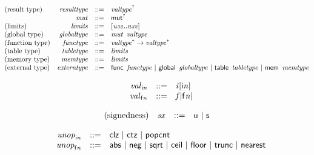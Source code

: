 $$
\begin{array}{@{}lrrl@{}l@{}}
\mbox{(result type)} & {\mathit{resulttype}} &::=& {{\mathit{valtype}}^?} \\
& {\mathit{mut}} &::=& {\mathsf{mut}^?} \\
\mbox{(limits)} & {\mathit{limits}} &::=& {}[{\mathit{u{\scriptstyle32}}} .. {\mathit{u{\scriptstyle32}}}] \\
\mbox{(global type)} & {\mathit{globaltype}} &::=& {\mathit{mut}}~\,{\mathit{valtype}} \\
\mbox{(function type)} & {\mathit{functype}} &::=& {{\mathit{valtype}}^\ast} \rightarrow {{\mathit{valtype}}^\ast} \\
\mbox{(table type)} & {\mathit{tabletype}} &::=& {\mathit{limits}} \\
\mbox{(memory type)} & {\mathit{memtype}} &::=& {\mathit{limits}} \\
\mbox{(external type)} & {\mathit{externtype}} &::=& \mathsf{func}~\,{\mathit{functype}} ~|~ \mathsf{global}~\,{\mathit{globaltype}} ~|~ \mathsf{table}~\,{\mathit{tabletype}} ~|~ \mathsf{mem}~\,{\mathit{memtype}} \\
\end{array}
$$

\vspace{1ex}

$$
\begin{array}{@{}lrrl@{}l@{}}
& {{\mathit{val}}}_{{\mathsf{i}}{{\mathit{n}}}} &::=& {{\mathit{i}}}{{|{\mathsf{i}}{{\mathit{n}}}|}} \\
& {{\mathit{val}}}_{{\mathsf{f}}{{\mathit{n}}}} &::=& {{\mathit{f}}}{{|{\mathsf{f}}{{\mathit{n}}}|}} \\
\end{array}
$$

\vspace{1ex}

$$
\begin{array}{@{}lrrl@{}l@{}}
\mbox{(signedness)} & {\mathit{sx}} &::=& \mathsf{u} ~|~ \mathsf{s} \\
\end{array}
$$

$$
\begin{array}{@{}lrrl@{}l@{}}
& {{\mathit{unop}}}_{{\mathsf{i}}{{\mathit{n}}}} &::=& \mathsf{clz} ~|~ \mathsf{ctz} ~|~ \mathsf{popcnt} \\
& {{\mathit{unop}}}_{{\mathsf{f}}{{\mathit{n}}}} &::=& \mathsf{abs} ~|~ \mathsf{neg} ~|~ \mathsf{sqrt} ~|~ \mathsf{ceil} ~|~ \mathsf{floor} ~|~ \mathsf{trunc} ~|~ \mathsf{nearest} \\
\end{array}
$$

